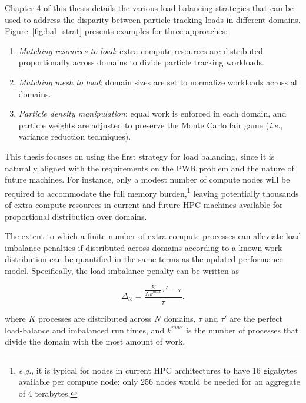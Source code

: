 \documentclass[12pt,twoside]{mitthesis-exec}
\begin{document}
Chapter 4 of this thesis details the various load balancing strategies that can
be used to address the disparity between particle tracking loads in different
domains. Figure~\ref{fig:bal_strat} presents examples for three approaches:




\begin{enumerate}
  \item \emph{Matching resources to load}: extra compute resources are
  distributed proportionally across domains to divide particle tracking
  workloads.
  \item \emph{Matching mesh to load}: domain sizes are set to normalize
  workloads across all domains.
  \item \emph{Particle density manipulation}: equal work is enforced in each
  domain, and particle weights are adjusted to preserve the Monte Carlo fair
  game (\emph{i.e.}, variance reduction techniques).
\end{enumerate}

This thesis focuses on using the first strategy for load balancing, since it is
naturally aligned with the requirements on the PWR problem and the nature of
future machines. For instance, only a modest number of compute nodes will be
required to accommodate the full memory burden,\footnote{\emph{e.g.}, it is
typical for nodes in current HPC architectures to have 16 gigabytes
available per compute node: only 256 nodes would be needed for an aggregate of 4
terabytes.} leaving potentially thousands of extra compute resources in current
and future HPC machines available for proportional distribution over domains.

The extent to which a finite number of extra compute
processes can alleviate load imbalance penalties if distributed across domains
according to a known work distribution can be quantified in the same terms as
the updated performance model. Specifically, the load imbalance penalty can be
written as

\begin{equation}
  \label{eqn:delta_lb_val}
    \Delta_{lb} = \frac{\frac{K}{N k^{max}}\tau' - \tau}{\tau}.
\end{equation}

\noindent where $K$ processes are distributed across $N$ domains, $\tau$ and
$\tau'$ are the perfect load-balance and imbalanced run times, and $k^{max}$ is
the number of processes that divide the domain with the most amount of work.
\end{document}

